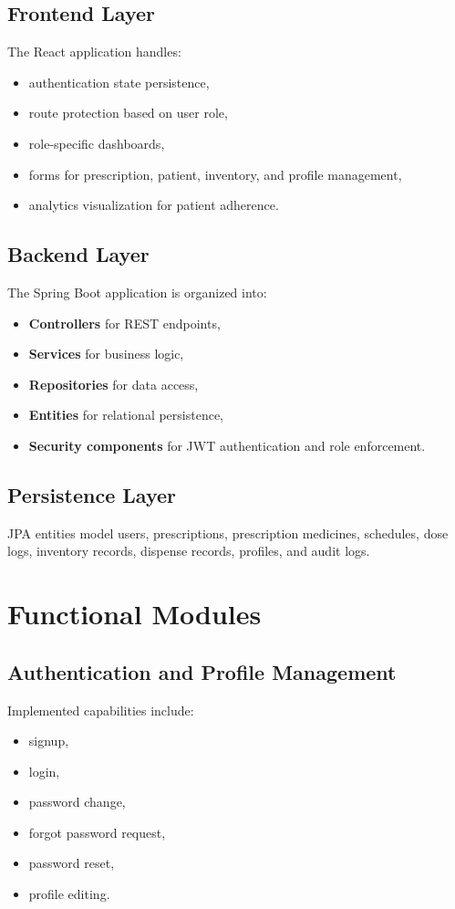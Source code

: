 \documentclass[12pt,a4paper]{article}
\begin{document}
\subsection{Frontend Layer}
The React application handles:
\begin{itemize}[leftmargin=*]
  \item authentication state persistence,
  \item route protection based on user role,
  \item role-specific dashboards,
  \item forms for prescription, patient, inventory, and profile management,
  \item analytics visualization for patient adherence.
\end{itemize}

\subsection{Backend Layer}
The Spring Boot application is organized into:
\begin{itemize}[leftmargin=*]
  \item \textbf{Controllers} for REST endpoints,
  \item \textbf{Services} for business logic,
  \item \textbf{Repositories} for data access,
  \item \textbf{Entities} for relational persistence,
  \item \textbf{Security components} for JWT authentication and role enforcement.
\end{itemize}

\subsection{Persistence Layer}
JPA entities model users, prescriptions, prescription medicines, schedules, dose logs, inventory records, dispense records, profiles, and audit logs.

\section{Functional Modules}
\subsection{Authentication and Profile Management}
Implemented capabilities include:
\begin{itemize}[leftmargin=*]
  \item signup,
  \item login,
  \item password change,
  \item forgot password request,
  \item password reset,
  \item profile editing.
\end{itemize}
\end{document}
